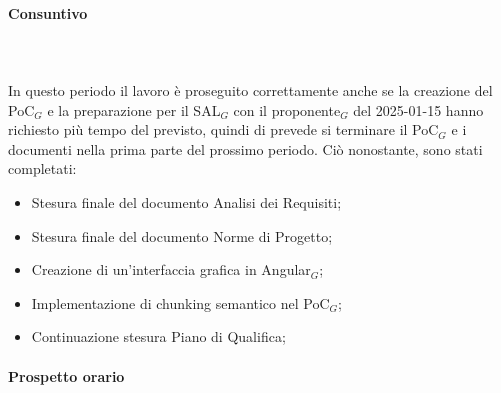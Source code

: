 \paragraph{Consuntivo} \hspace{1cm} 
\\ \hspace{1cm} \\
In questo periodo il lavoro è proseguito correttamente anche se la creazione del PoC$_G$ e la preparazione per il SAL$_G$ con il proponente$_G$ del 2025-01-15 hanno richiesto più tempo del previsto, quindi di prevede si terminare il PoC$_G$ e i documenti nella prima parte del prossimo periodo. Ciò nonostante, sono stati completati:
\begin{itemize}
    \item Stesura finale del documento Analisi dei Requisiti;
    \item Stesura finale del documento Norme di Progetto;
    \item Creazione di un'interfaccia grafica in Angular$_G$;
    \item Implementazione di chunking semantico nel PoC$_G$;
    \item Continuazione stesura Piano di Qualifica;
\end{itemize}

\paragraph{Prospetto orario} \hspace{1cm}
\begin{table}[H]
\centering
{}
\caption{Consuntivo dell'impegno orario di ciascun membro durante il periodo IV}
\end{table}

